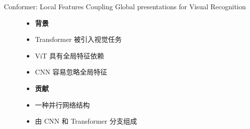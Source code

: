 \documentclass[CJK,aspectratio=169]{beamer}  %
\begin{document}
	\begin{frame}
		
		{ \yahei Conformer: Local Features Coupling Global presentations for Visual Recognition\textcolor{blue}{\citep{peng2021conformer}}}
		\begin{figure}
			\centering
			\begin{minipage}{.4\textwidth}
				\centering
				\begin{itemize}
					\item \textbf{背景}
					
					\item[\checkmark]
					Transformer 被引入视觉任务
					
					\item[\checkmark]
					ViT 具有全局特征依赖
					
					\item[\checkmark]
					CNN 容易忽略全局特征
				\end{itemize}
				
				\begin{itemize}
					\item \textbf{贡献}
					
					\item[\checkmark]
					一种并行网络结构
					
					\item[\checkmark]
					由 CNN 和 Transformer 分支组成
					
					

\end{itemize}
\end{minipage}
\end{figure}
\end{frame}
\end{document}
